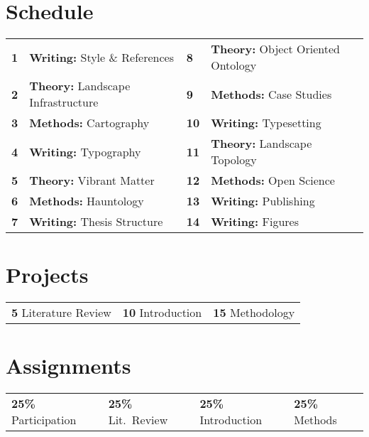 \documentclass[11pt,article,oneside]{memoir}
\begin{document}
\section{Schedule}

\begin{table}[H]
\begin{tabular}{l l l l}
\textbf{1} & \textbf{Writing:} Style \& References \hspace{4em}  & \textbf{8} & \textbf{Theory:} Object Oriented Ontology \\
\textbf{2} & \textbf{Theory:} Landscape Infrastructure & \textbf{9} & \textbf{Methods:}  Case Studies \\
\textbf{3} & \textbf{Methods:} Cartography & \textbf{10} & \textbf{Writing:} Typesetting \\
\textbf{4} & \textbf{Writing:} Typography & \textbf{11} & \textbf{Theory:} Landscape Topology \\
\textbf{5} & \textbf{Theory:} Vibrant Matter & \textbf{12} & \textbf{Methods:} Open Science \\
\textbf{6} & \textbf{Methods:} Hauntology & \textbf{13} & \textbf{Writing:} Publishing \\
\textbf{7} & \textbf{Writing:} Thesis Structure & \textbf{14} & \textbf{Writing:} Figures \\
\end{tabular}
\end{table}

\section{Projects}
%
\begin{table}[H]
\begin{tabular}{l @{\hskip 2.25cm} l @{\hskip 2.25cm} l}
\textbf{5} \enspace Literature Review & \textbf{10}  \enspace Introduction & \textbf{15} \enspace Methodology
\end{tabular}
\end{table}

\section{Assignments}
%
\begin{table}[H]
\begin{tabular}{l @{\hskip 0.8cm} l @{\hskip 0.8cm} l @{\hskip 0.8cm} l}
\textbf{25\%} \enspace Participation & \textbf{25\%} \enspace Lit.~Review & \textbf{25\%} \enspace Introduction & \textbf{25\%} \enspace Methods \\
\end{tabular}
\end{table}
\end{document}
